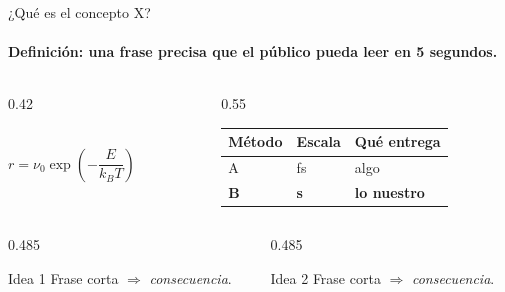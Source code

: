 \documentclass[aspectratio=169,11pt]{beamer}
\newcommand{\kB}{k_{B}}
\begin{document}
\begin{frame}{¿Qué es el concepto X?}
  \framesubtitle{\textbf{Definición:} una frase precisa que el público pueda leer en 5 segundos.}
  \begin{columns}[c,onlytextwidth]
    \begin{column}{0.42\textwidth}
      \centering
      \\[0.1em]
      {\small $r = \nu_0 \exp\!\left(-\dfrac{E}{\kB T}\right)$}
    \end{column}
    \begin{column}{0.55\textwidth}
      \centering\footnotesize
      \renewcommand{\arraystretch}{1.15}
      \begin{tabular}{@{}lll@{}}
        \toprule
        Método & Escala & Qué entrega \\
        \midrule
        A & fs & algo \\
        \textbf{B} & \textbf{s} & \textbf{lo nuestro} \\
        \bottomrule
      \end{tabular}
    \end{column}
  \end{columns}
  \vspace{0.5em}
  \begin{columns}[T,onlytextwidth]
    \begin{column}{0.485\textwidth}
      \begin{block}{Idea 1}
        \footnotesize Frase corta $\Rightarrow$ \emph{consecuencia}.
      \end{block}
    \end{column}
    \begin{column}{0.485\textwidth}
      \begin{block}{Idea 2}
        \footnotesize Frase corta $\Rightarrow$ \emph{consecuencia}.
      \end{block}
    \end{column}
  \end{columns}
\end{frame}
\end{document}
